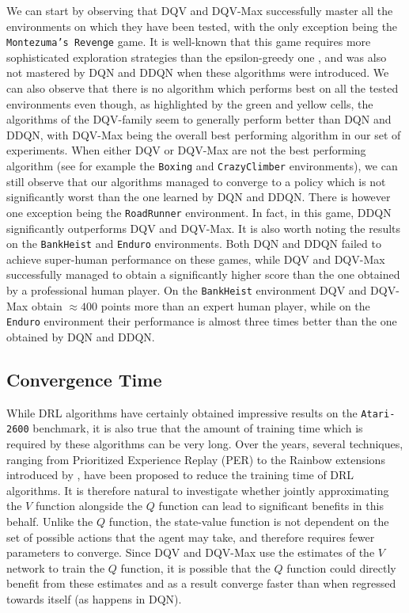 We can start by observing that DQV and DQV-Max successfully master all the environments on which they have been tested, with the only exception being the \texttt{Montezuma's Revenge} game. It is well-known that this game requires more sophisticated exploration strategies than the epsilon-greedy one \cite{fortunato2017noisy}, and was also not mastered by DQN and DDQN when these algorithms were introduced. We can also observe that there is no algorithm which performs best on all the tested environments even though, as highlighted by the green and yellow cells, the algorithms of the DQV-family seem to generally perform better than DQN and DDQN, with DQV-Max being the overall best performing algorithm in our set of experiments. When either DQV or DQV-Max are not the best performing algorithm (see for example the \texttt{Boxing} and \texttt{CrazyClimber} environments), we can still observe that our algorithms managed to converge to a policy which is not significantly worst than the one learned by DQN and DDQN.
There is however one exception being the \texttt{RoadRunner} environment. In fact, in this game, DDQN significantly outperforms DQV and DQV-Max. It is also worth noting the results on the \texttt{BankHeist} and \texttt{Enduro} environments. Both DQN and DDQN failed to achieve super-human performance on these games, while DQV and DQV-Max successfully managed to obtain a significantly higher score than the one obtained by a professional human player. On the \texttt{BankHeist} environment DQV and DQV-Max obtain $\approx 400$ points more than an expert human player, while on the \texttt{Enduro} environment their performance is almost three times better than the one obtained by DQN and DDQN.




\subsection{Convergence Time}
\label{sec:convergence_time}

While DRL algorithms have certainly obtained impressive results on the \texttt{Atari-2600} benchmark, it is also true that the amount of training time which is required by these algorithms can be very long. Over the years, several techniques, ranging from Prioritized Experience Replay (PER) \cite{wang2016dueling} to the Rainbow extensions introduced by \citet{hessel2018rainbow}, have been proposed to reduce the training time of DRL algorithms. It is therefore natural to investigate whether jointly approximating the $V$ function alongside the $Q$ function can lead to significant benefits in this behalf. Unlike the $Q$ function, the state-value function is not dependent on the set of possible actions that the agent may take, and therefore requires fewer parameters to converge. Since DQV and DQV-Max use the estimates of the $V$ network to train the $Q$ function, it is possible that the $Q$ function could directly benefit from these estimates and as a result converge faster than when regressed towards itself (as happens in DQN).

